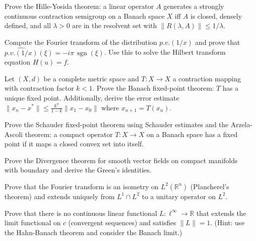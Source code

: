 \documentclass[12pt,a4paper]{exam}
\begin{document}
\begin{questions}
\vspace{0.3cm}

\question[3]
Prove the Hille-Yosida theorem: a linear operator $A$ generates a strongly continuous contraction semigroup on a Banach space $X$ iff $A$ is closed, densely defined, and all $\lambda > 0$ are in the resolvent set with $\|R(\lambda,A)\| \leq 1/\lambda$.

\vspace{0.3cm}

\question[4]
Compute the Fourier transform of the distribution $p.v.(1/x)$ and prove that $\widehat{p.v.(1/x)}(\xi) = -i\pi \, \operatorname{sgn}(\xi)$. Use this to solve the Hilbert transform equation $H(u) = f$.

\vspace{0.3cm}

\question[3]
Let $(X, d)$ be a complete metric space and $T: X \to X$ a contraction mapping with contraction factor $k < 1$. Prove the Banach fixed-point theorem: $T$ has a unique fixed point. Additionally, derive the error estimate $\|x_n - x^*\| \leq \frac{k^n}{1-k} \|x_1 - x_0\|$ where $x_{n+1} = T(x_n)$.

\vspace{0.3cm}

\question[5]
Prove the Schauder fixed-point theorem using Schauder estimates and the Arzela-Ascoli theorem: a compact operator $T: X \to X$ on a Banach space has a fixed point if it maps a closed convex set into itself.

\vspace{0.3cm}

\question[4]
Prove the Divergence theorem for smooth vector fields on compact manifolds with boundary and derive the Green's identities.

\vspace{0.3cm}

\question[3]
Prove that the Fourier transform is an isometry on $L^2(\mathbb{R}^n)$ (Plancherel's theorem) and extends uniquely from $L^1 \cap L^2$ to a unitary operator on $L^2$.

\vspace{0.3cm}

\question[4]
Prove that there is no continuous linear functional $L: \ell^\infty \to \mathbb{R}$ that extends the limit functional on $c$ (convergent sequences) and satisfies $\|L\| = 1$. (Hint: use the Hahn-Banach theorem and consider the Banach limit.)

\vspace{0.3cm}


\end{questions}
\end{document}
